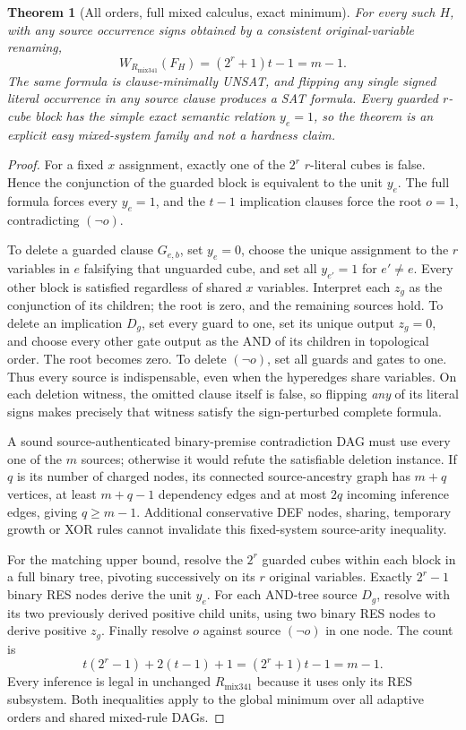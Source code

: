 \documentclass[11pt]{article}
\newtheorem{theorem}{Theorem}
\begin{document}
\begin{theorem}[All orders, full mixed calculus, exact minimum]
For every such $H$, with any source occurrence signs obtained by a consistent original-variable renaming,
\[
 \boxed{W_{R_{\mathrm{mix341}}}(F_H)
       =(2^r+1)t-1=m-1.}
\]
The same formula is clause-minimally UNSAT, and flipping any single signed literal occurrence in any source clause produces a SAT formula. Every guarded $r$-cube block has the simple exact semantic relation $y_e=1$, so the theorem is an explicit \emph{easy} mixed-system family and not a hardness claim.
\end{theorem}
\begin{proof}
For a fixed $x$ assignment, exactly one of the $2^r$ $r$-literal cubes is false. Hence the conjunction of the guarded block is equivalent to the unit $y_e$. The full formula forces every $y_e=1$, and the $t-1$ implication clauses force the root $o=1$, contradicting $(\neg o)$.

To delete a guarded clause $G_{e,b}$, set $y_e=0$, choose the unique assignment to the $r$ variables in $e$ falsifying that unguarded cube, and set all $y_{e'}=1$ for $e'\ne e$. Every other block is satisfied regardless of shared $x$ variables. Interpret each $z_g$ as the conjunction of its children; the root is zero, and the remaining sources hold. To delete an implication $D_g$, set every guard to one, set its unique output $z_g=0$, and choose every other gate output as the AND of its children in topological order. The root becomes zero. To delete $(\neg o)$, set all guards and gates to one. Thus every source is indispensable, even when the hyperedges share variables. On each deletion witness, the omitted clause itself is false, so flipping \emph{any} of its literal signs makes precisely that witness satisfy the sign-perturbed complete formula.

A sound source-authenticated binary-premise contradiction DAG must use every one of the $m$ sources; otherwise it would refute the satisfiable deletion instance. If $q$ is its number of charged nodes, its connected source-ancestry graph has $m+q$ vertices, at least $m+q-1$ dependency edges and at most $2q$ incoming inference edges, giving $q\ge m-1$. Additional conservative DEF nodes, sharing, temporary growth or XOR rules cannot invalidate this fixed-system source-arity inequality.

For the matching upper bound, resolve the $2^r$ guarded cubes within each block in a full binary tree, pivoting successively on its $r$ original variables. Exactly $2^r-1$ binary RES nodes derive the unit $y_e$. For each AND-tree source $D_g$, resolve with its two previously derived positive child units, using two binary RES nodes to derive positive $z_g$. Finally resolve $o$ against source $(\neg o)$ in one node. The count is
\[
 t(2^r-1)+2(t-1)+1=(2^r+1)t-1=m-1.
\]
Every inference is legal in unchanged $R_{\mathrm{mix341}}$ because it uses only its RES subsystem. Both inequalities apply to the global minimum over all adaptive orders and shared mixed-rule DAGs.
\end{proof}
\end{document}
